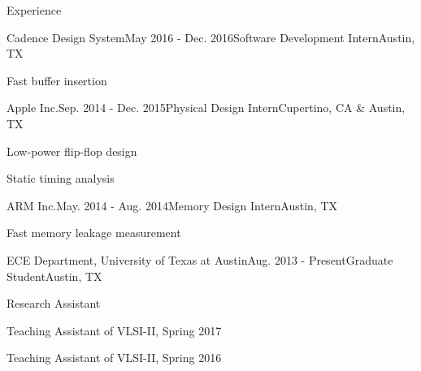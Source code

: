 \documentclass{resume} %
\begin{document}
\begin{rSection}{Experience}

\begin{rSubsection}{Cadence Design System}{May 2016 - Dec. 2016}{Software Development Intern}{Austin, TX}
\item Fast buffer insertion
\end{rSubsection}


\begin{rSubsection}{Apple Inc.}{Sep. 2014 - Dec. 2015}{Physical Design Intern}{Cupertino, CA \& Austin, TX}
\item Low-power flip-flop design
\item Static timing analysis
\end{rSubsection}


\begin{rSubsection}{ARM Inc.}{May. 2014 - Aug. 2014}{Memory Design Intern}{Austin, TX}
\item Fast memory leakage measurement
\end{rSubsection}


\begin{rSubsection}{ECE Department, University of Texas at Austin}{Aug. 2013 - Present}{Graduate Student}{Austin, TX}
\item Research Assistant
\item Teaching Assistant of VLSI-II, Spring 2017
\item Teaching Assistant of VLSI-II, Spring 2016
\end{rSubsection}

\end{rSection}

\end{document}
